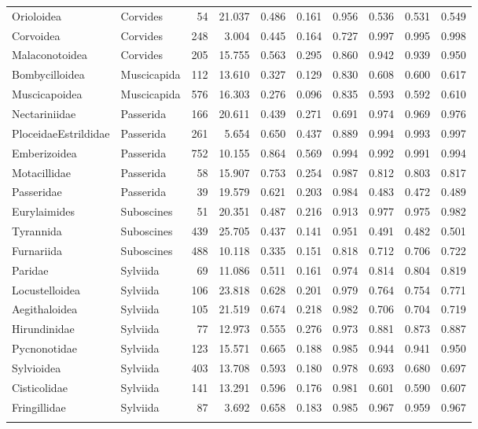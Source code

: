 \begin{longtable}{llrrrrrrrr}
  Orioloidea & Corvides &   54 & 21.037 & 0.486 & 0.161 & 0.956 & 0.536 & 0.531 & 0.549 \\ 
  Corvoidea & Corvides &  248 & 3.004 & 0.445 & 0.164 & 0.727 & 0.997 & 0.995 & 0.998 \\ 
  Malaconotoidea & Corvides &  205 & 15.755 & 0.563 & 0.295 & 0.860 & 0.942 & 0.939 & 0.950 \\ 
  Bombycilloidea & Muscicapida &  112 & 13.610 & 0.327 & 0.129 & 0.830 & 0.608 & 0.600 & 0.617 \\ 
  Muscicapoidea & Muscicapida &  576 & 16.303 & 0.276 & 0.096 & 0.835 & 0.593 & 0.592 & 0.610 \\ 
  Nectariniidae & Passerida &  166 & 20.611 & 0.439 & 0.271 & 0.691 & 0.974 & 0.969 & 0.976 \\ 
  PloceidaeEstrildidae & Passerida &  261 & 5.654 & 0.650 & 0.437 & 0.889 & 0.994 & 0.993 & 0.997 \\ 
  Emberizoidea & Passerida &  752 & 10.155 & 0.864 & 0.569 & 0.994 & 0.992 & 0.991 & 0.994 \\ 
  Motacillidae & Passerida &   58 & 15.907 & 0.753 & 0.254 & 0.987 & 0.812 & 0.803 & 0.817 \\ 
  Passeridae & Passerida &   39 & 19.579 & 0.621 & 0.203 & 0.984 & 0.483 & 0.472 & 0.489 \\ 
  Eurylaimides & Suboscines &   51 & 20.351 & 0.487 & 0.216 & 0.913 & 0.977 & 0.975 & 0.982 \\ 
  Tyrannida & Suboscines &  439 & 25.705 & 0.437 & 0.141 & 0.951 & 0.491 & 0.482 & 0.501 \\ 
  Furnariida & Suboscines &  488 & 10.118 & 0.335 & 0.151 & 0.818 & 0.712 & 0.706 & 0.722 \\ 
  Paridae & Sylviida &   69 & 11.086 & 0.511 & 0.161 & 0.974 & 0.814 & 0.804 & 0.819 \\ 
  Locustelloidea & Sylviida &  106 & 23.818 & 0.628 & 0.201 & 0.979 & 0.764 & 0.754 & 0.771 \\ 
  Aegithaloidea & Sylviida &  105 & 21.519 & 0.674 & 0.218 & 0.982 & 0.706 & 0.704 & 0.719 \\ 
  Hirundinidae & Sylviida &   77 & 12.973 & 0.555 & 0.276 & 0.973 & 0.881 & 0.873 & 0.887 \\ 
  Pycnonotidae & Sylviida &  123 & 15.571 & 0.665 & 0.188 & 0.985 & 0.944 & 0.941 & 0.950 \\ 
  Sylvioidea & Sylviida &  403 & 13.708 & 0.593 & 0.180 & 0.978 & 0.693 & 0.680 & 0.697 \\ 
  Cisticolidae & Sylviida &  141 & 13.291 & 0.596 & 0.176 & 0.981 & 0.601 & 0.590 & 0.607 \\ 
  Fringillidae & Sylviida &   87 & 3.692 & 0.658 & 0.183 & 0.985 & 0.967 & 0.959 & 0.967 \\ 
   \hline
\label{tab_ortho_results}
\end{longtable}
